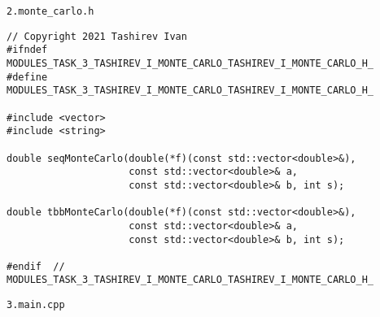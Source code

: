 \documentclass{report}
\begin{document}
\par \verb|2.monte_carlo.h|
\begin{lstlisting}
// Copyright 2021 Tashirev Ivan
#ifndef MODULES_TASK_3_TASHIREV_I_MONTE_CARLO_TASHIREV_I_MONTE_CARLO_H_
#define MODULES_TASK_3_TASHIREV_I_MONTE_CARLO_TASHIREV_I_MONTE_CARLO_H_

#include <vector>
#include <string>

double seqMonteCarlo(double(*f)(const std::vector<double>&),
                     const std::vector<double>& a,
                     const std::vector<double>& b, int s);

double tbbMonteCarlo(double(*f)(const std::vector<double>&),
                     const std::vector<double>& a,
                     const std::vector<double>& b, int s);

#endif  // MODULES_TASK_3_TASHIREV_I_MONTE_CARLO_TASHIREV_I_MONTE_CARLO_H_
\end{lstlisting}
\par \verb|3.main.cpp|
\end{document}
